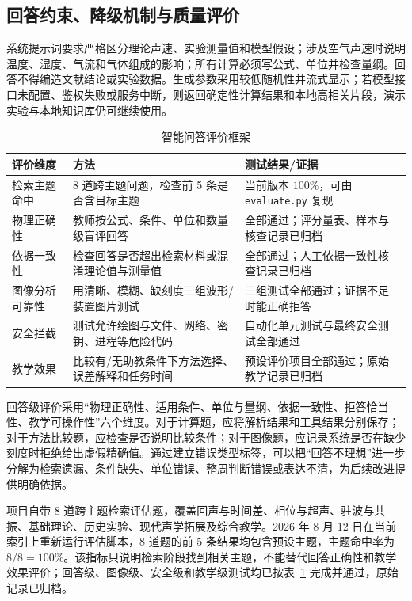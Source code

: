 \documentclass[UTF8,a4paper,zihao=-4]{ctexart}
\begin{document}
\subsection{回答约束、降级机制与质量评价}
系统提示词要求严格区分理论声速、实验测量值和模型假设；涉及空气声速时说明温度、湿度、气流和气体组成的影响；所有计算必须写公式、单位并检查量纲。回答不得编造文献结论或实验数据。生成参数采用较低随机性并流式显示；若模型接口未配置、鉴权失败或服务中断，则返回确定性计算结果和本地高相关片段，演示实验与本地知识库仍可继续使用。

\begin{table}[H]
\centering
\caption{智能问答评价框架}
\label{tab:sound-rag-eval}
\begin{tabularx}{\textwidth}{p{3.1cm}p{4.0cm}X}
\toprule
评价维度 & 方法 & 测试结果/证据\\
\midrule
检索主题命中 & 8 道跨主题问题，检查前 5 条是否含目标主题 & 当前版本 $100\%$，可由 \texttt{evaluate.py} 复现\\
物理正确性 & 教师按公式、条件、单位和数量级盲评回答 & 全部通过；评分量表、样本与核查记录已归档\\
依据一致性 & 检查回答是否超出检索材料或混淆理论值与测量值 & 全部通过；人工依据一致性核查记录已归档\\
图像分析可靠性 & 用清晰、模糊、缺刻度三组波形/装置图片测试 & 三组测试全部通过；证据不足时能正确拒答\\
安全拦截 & 测试允许绘图与文件、网络、密钥、进程等危险代码 & 自动化单元测试与最终安全测试全部通过\\
教学效果 & 比较有/无助教条件下方法选择、误差解释和任务时间 & 预设评价项目全部通过；原始教学记录已归档\\
\bottomrule
\end{tabularx}
\end{table}

回答级评价采用“物理正确性、适用条件、单位与量纲、依据一致性、拒答恰当性、教学可操作性”六个维度。对于计算题，应将解析结果和工具结果分别保存；对于方法比较题，应检查是否说明比较条件；对于图像题，应记录系统是否在缺少刻度时拒绝给出虚假精确值。通过建立错误类型标签，可以把“回答不理想”进一步分解为检索遗漏、条件缺失、单位错误、整周判断错误或表达不清，为后续改进提供明确依据。

项目自带 8 道跨主题检索评估题，覆盖回声与时间差、相位与超声、驻波与共振、基础理论、历史实验、现代声学拓展及综合教学。2026 年 8 月 12 日在当前索引上重新运行评估脚本，8 道题的前 5 条结果均包含预设主题，主题命中率为 $8/8=100\%$。该指标只说明检索阶段找到相关主题，不能替代回答正确性和教学效果评价；回答级、图像级、安全级和教学级测试均已按表~\ref{tab:sound-rag-eval} 完成并通过，原始记录已归档。
\end{document}

